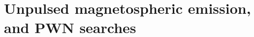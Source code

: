 \documentclass[12pt,preprint]{aastex}
\begin{document}




\section{Unpulsed magnetospheric emission, and PWN searches}









\appendix

\end{document}
